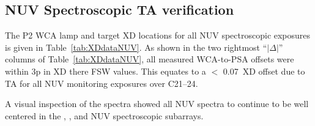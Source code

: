 \subsection{NUV Spectroscopic TA verification}\label{subsec:NspVER}
The P2 WCA lamp and target XD locations for all NUV spectroscopic exposures is given in Table~\ref{tab:XDdataNUV}.
As shown in the two rightmost ``$| \Delta |$'' columns of Table~\ref{tab:XDdataNUV}, all measured WCA-to-PSA offsets were within 3p in XD there FSW values. This equates to a $<$ 0.07\arcsec\ XD offset due to TA
for all NUV monitoring exposures over C21--24.

A visual inspection of the spectra showed all NUV spectra to continue to be well centered in the , , and  NUV spectroscopic subarrays.

